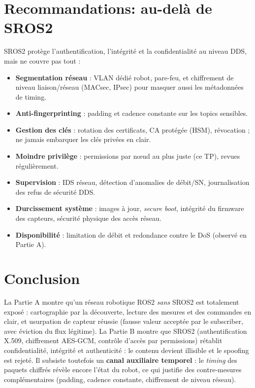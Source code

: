 \documentclass[11pt,a4paper]{article}
\begin{document}
\section{Recommandations: au-delà de SROS2}
SROS2 protège l'authentification, l'intégrité et la confidentialité au niveau
DDS, mais ne couvre pas tout :
\begin{itemize}[nosep]
  \item \textbf{Segmentation réseau} : VLAN dédié robot, pare-feu, et
        chiffrement de niveau liaison/réseau (MACsec, IPsec) pour masquer aussi
        les métadonnées de timing.
  \item \textbf{Anti-fingerprinting} : padding et cadence constante sur les
        topics sensibles.
  \item \textbf{Gestion des clés} : rotation des certificats, CA protégée (HSM),
        révocation ; ne jamais embarquer les clés privées en clair.
  \item \textbf{Moindre privilège} : permissions par nœud au plus juste (ce TP),
        revues régulièrement.
  \item \textbf{Supervision} : IDS réseau, détection d'anomalies de débit/SN,
        journalisation des refus de sécurité DDS.
  \item \textbf{Durcissement système} : images à jour, \emph{secure boot},
        intégrité du firmware des capteurs, sécurité physique des accès réseau.
  \item \textbf{Disponibilité} : limitation de débit et redondance contre le DoS
        (observé en Partie A).
\end{itemize}

\section{Conclusion}
La Partie A montre qu'un réseau robotique ROS2 \emph{sans} SROS2 est totalement
exposé : cartographie par la découverte, lecture des mesures et des commandes en
clair, et usurpation de capteur réussie (fausse valeur acceptée par le
subscriber, avec éviction du flux légitime). La Partie B montre que SROS2
(authentification X.509, chiffrement AES-GCM, contrôle d'accès par permissions)
rétablit confidentialité, intégrité et authenticité : le contenu devient
illisible et le spoofing est rejeté. Il subsiste toutefois un \textbf{canal
auxiliaire temporel} : le \emph{timing} des paquets chiffrés révèle encore
l'état du robot, ce qui justifie des contre-mesures complémentaires (padding,
cadence constante, chiffrement de niveau réseau).
\end{document}
